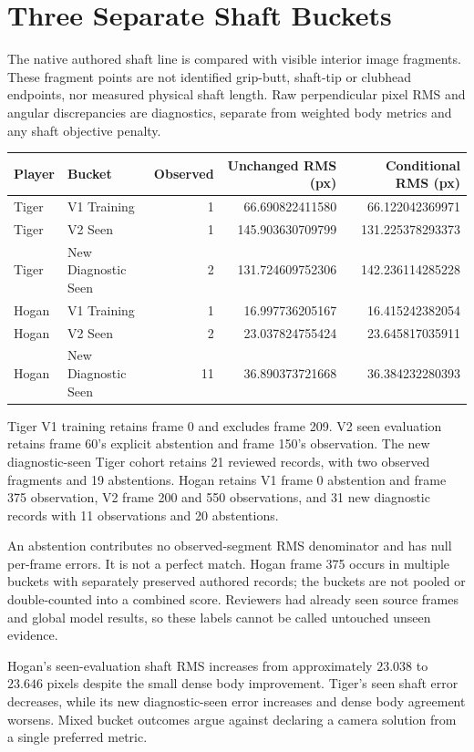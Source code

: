 \documentclass[11pt]{article}
\begin{document}
\section*{Three Separate Shaft Buckets}
The native authored shaft line is compared with visible interior image fragments. These fragment points are not identified grip-butt, shaft-tip or clubhead endpoints, nor measured physical shaft length. Raw perpendicular pixel RMS and angular discrepancies are diagnostics, separate from weighted body metrics and any shaft objective penalty.
\begin{center}\small\begin{tabular}{llrrr}\toprule
Player & Bucket & Observed & Unchanged RMS (px) & Conditional RMS (px)\\\midrule
Tiger & V1 Training & 1 & 66.690822411580 & 66.122042369971 \\
Tiger & V2 Seen & 1 & 145.903630709799 & 131.225378293373 \\
Tiger & New Diagnostic Seen & 2 & 131.724609752306 & 142.236114285228 \\
Hogan & V1 Training & 1 & 16.997736205167 & 16.415242382054 \\
Hogan & V2 Seen & 2 & 23.037824755424 & 23.645817035911 \\
Hogan & New Diagnostic Seen & 11 & 36.890373721668 & 36.384232280393 \\
\bottomrule\end{tabular}\end{center}
Tiger V1 training retains frame 0 and excludes frame 209. V2 seen evaluation retains frame 60's explicit abstention and frame 150's observation. The new diagnostic-seen Tiger cohort retains 21 reviewed records, with two observed fragments and 19 abstentions. Hogan retains V1 frame 0 abstention and frame 375 observation, V2 frame 200 and 550 observations, and 31 new diagnostic records with 11 observations and 20 abstentions.

An abstention contributes no observed-segment RMS denominator and has null per-frame errors. It is not a perfect match. Hogan frame 375 occurs in multiple buckets with separately preserved authored records; the buckets are not pooled or double-counted into a combined score. Reviewers had already seen source frames and global model results, so these labels cannot be called untouched unseen evidence.

Hogan's seen-evaluation shaft RMS increases from approximately $23.038$ to $23.646$ pixels despite the small dense body improvement. Tiger's seen shaft error decreases, while its new diagnostic-seen error increases and dense body agreement worsens. Mixed bucket outcomes argue against declaring a camera solution from a single preferred metric.
\end{document}
